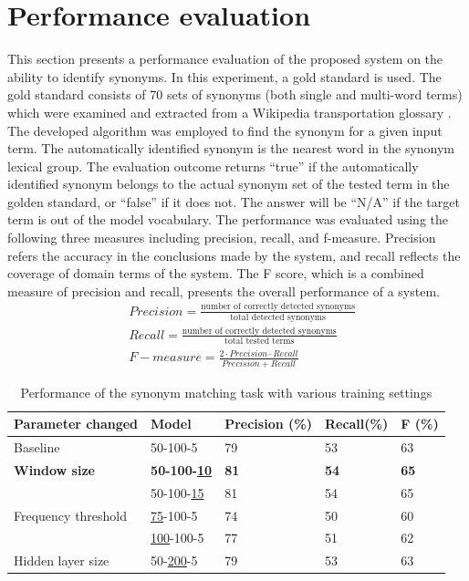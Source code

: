 \documentclass[Journal, BackFigs,NoLists, DoubleSpace]{ascelike}%
\begin{document}
\section{Performance evaluation} \label{sec:eval_RoadLex}
%
This section presents a performance evaluation of the proposed system on the ability to identify synonyms. In this experiment, a gold standard is used. The gold standard consists of 70 sets of synonyms (both single and multi-word terms) which were examined and extracted from a Wikipedia transportation glossary \cite{wikipedia16}. The developed algorithm was employed to find the synonym for a given input term. The automatically identified synonym is the nearest word in the synonym lexical group. The evaluation outcome returns ``true'' if the automatically identified synonym belongs to the actual synonym set of the tested term in the golden standard, or ``false'' if it does not. The answer will be ``N/A'' if the target term is out of the model vocabulary. The performance was evaluated using the following three measures including precision, recall, and f-measure. Precision refers the accuracy in the conclusions made by the system, and recall reflects the coverage of domain terms of the system. The F score, which is a combined measure of precision and recall, presents the overall performance of a system. 
%
\begin{align} 
&Precision = \frac{\text{number of correctly detected synonyms}}{\text{total detected synonyms}}  \\
&Recall = \frac{\text{number of correctly detected synonyms}}{\text{total tested terms}}  \\ 
&F-measure = \frac{2 \cdot Precision \cdot Recall}{Precision+Recall}
\end{align}
%
\begin{table} [b] 
	\caption{Performance of the synonym matching task with various training settings}
	\label{table:eval_syn_par_effect}
	\centering
	\small
	\renewcommand{\arraystretch}{1.25}
	\begin{tabular}{l l l l l }
		\hline
		\hline
		\textbf{Parameter changed} & \textbf{Model} & \textbf{Precision (\%)}  & \textbf{Recall(\%)} & \textbf{F (\%)}\\
		\hline
		Baseline	&	50-100-5	&79		&53		&63\\
		\hline
		\textbf{Window size}	&\textbf{50-100-\underline{10}}	&\textbf{81}		&\textbf{54}		&\textbf{65}\\
		&50-100-\underline{15}	&81		&54		&65\\
		\hline		
		Frequency threshold	&\underline{75}-100-5	&74		&50		&60\\
		&\underline{100}-100-5	&77		&51		&62\\
		\hline
		Hidden layer size	&50-\underline{200}-5	&79		&53		&63\\
		\hline
		\hline
	\end{tabular}
	\normalsize
\end{table}
\end{document}
